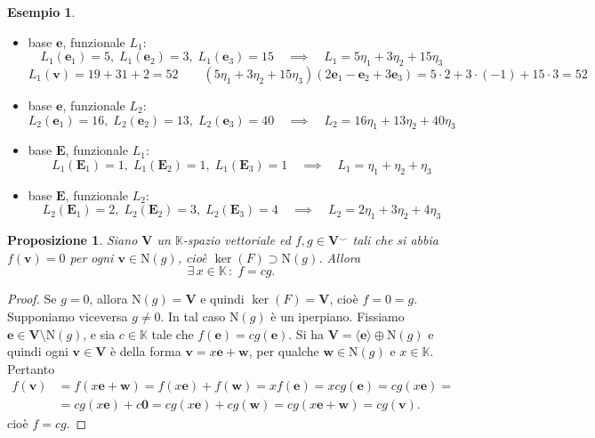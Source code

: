 \documentclass{article}
\theoremstyle{plain}
\newtheorem{prop}[thm]{Proposizione}
\theoremstyle{definition}
\newtheorem{exmp}{Esempio}[section]
\theoremstyle{remark}
\begin{document}
\begin{exmp}
\[    \]
    \begin{itemize}
        \item base $\mathbf{e}$, funzionale $L_1$:
        \[L_1(\mathbf{e}_1)=5 ,\; L_1(\mathbf{e}_2)=3 ,\; L_1(\mathbf{e}_3)=15 \quad\implies\quad L_1=5\eta_1+3\eta_2+15\eta_3\]
        \[L_1(\mathbf{v})=19+31+2=52\quad\quad (5\eta_1+3\eta_2+15\eta_3)(2\mathbf{e}_1-\mathbf{e}_2+3\mathbf{e}_3)=5\cdot2+3\cdot(-1)+15\cdot3=52\]
        \item base $\mathbf{e}$, funzionale $L_2$:
        \[L_2(\mathbf{e}_1)=16 ,\; L_2(\mathbf{e}_2)=13 ,\; L_2(\mathbf{e}_3)=40 \quad\implies\quad L_2=16\eta_1+13\eta_2+40\eta_3\]
        \item base $\mathbf{E}$, funzionale $L_1$:
        \[L_1(\mathbf{E}_1)=1 ,\; L_1(\mathbf{E}_2)=1 ,\; L_1(\mathbf{E}_3)=1 \quad\implies\quad L_1=\eta_1+\eta_2+\eta_3\]
        \item base $\mathbf{E}$, funzionale $L_2$:
        \[L_2(\mathbf{E}_1)=2 ,\; L_2(\mathbf{E}_2)=3 ,\; L_2(\mathbf{E}_3)=4 \quad\implies\quad L_2=2\eta_1+3\eta_2+4\eta_3\]
    \end{itemize}
\end{exmp}

\vspace{10pt}

\begin{bxthm}
\begin{prop}
    Siano $\mathbf{V}$ un $\mathbb{K}$-spazio vettoriale ed $f,g\in\mathbf{V}^\smallsmile$ tali che si abbia $f(\mathbf{v})=0$ per ogni $\mathbf{v}\in \mathrm{N}(g)$, cioè $\ker(F)\supset \mathrm{N}(g)$. Allora \[\exists\,x\in\mathbb{K}\,:\;f=cg.\]
\end{prop}
\end{bxthm}
\begin{proof}
    Se $g=\mathit{0}$, allora $\mathrm{N}(g)=\mathbf{V}$ e quindi $\ker(F)=\mathbf{V}$, cioè $f=\mathit{0}=g$. Supponiamo viceversa $g\neq\mathit{0}$. In tal caso $\mathrm{N}(g)$ è un iperpiano. Fissiamo $\mathbf{e}\in\mathbf{V}\setminus \mathrm{N}(g)$, e sia $c\in\mathbb{K}$ tale che 
    $f(\mathbf{e})=cg(\mathbf{e})$. Si ha $\mathbf{V}=\langle\mathbf{e}\rangle\oplus \mathrm{N}(g)$ e quindi ogni $\mathbf{v}\in\mathbf{V}$ è della forma $\mathbf{v}=x\mathbf{e}+\mathbf{w}$, per qualche $\mathbf{w}\in \mathrm{N}(g)$ e $x\in\mathbb{K}$. Pertanto 
    \begin{align*}
        f(\mathbf{v})&=f(x\mathbf{e}+\mathbf{w})=f(x\mathbf{e})+f(\mathbf{w})=xf(\mathbf{e})=xcg(\mathbf{e})=cg(x\mathbf{e})=\\
        &=cg(x\mathbf{e})+c\mathbf{0}=cg(x\mathbf{e})+cg(\mathbf{w})=cg(x\mathbf{e}+\mathbf{w})=cg(\mathbf{v}).
    \end{align*}
    cioè $f=cg$.
\end{proof}
\end{document}
